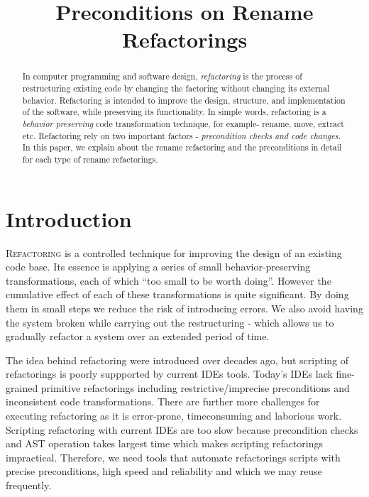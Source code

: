 \documentclass[10pt,conference]{IEEEtran}
\begin{document}
\title{Preconditions on Rename Refactorings}

\author{
\and
{}
\and
{}
}

\maketitle

\begin{abstract}
In computer programming and software design, \emph{refactoring} is the process of restructuring existing code by changing the factoring without changing its external behavior. Refactoring is intended to improve the design, structure, and implementation of the software, while preserving its functionality. In simple words, refactoring is a \emph{behavior preserving} code transformation technique, for example- rename, move, extract etc. Refactoring rely on two important factors - \emph{precondition checks and code changes}. In this paper, we explain about the rename refactoring and the preconditions in detail for each type of rename refactorings.
\end{abstract}

\section{\textbf{Introduction}}
\lettrine{R}{efactoring} is a controlled technique for improving the design of an existing code base. Its essence is applying a series of small behavior-preserving transformations, each of which ``too small to be worth doing''. However the cumulative effect of each of these transformations is quite significant. By doing them in small steps we reduce the risk of introducing errors. We also avoid having the system broken while carrying out the restructuring - which allows us to gradually refactor a system over an extended period of time.~\cite{Fowler}

The idea behind refactoring were introduced over decades ago, but scripting of refactorings is poorly suppported by current IDEs tools. Today’s IDEs lack fine-grained primitive refactorings including restrictive/imprecise preconditions and inconsistent code transformations. There are further more challenges for executing refactoring as it is error-prone, timeconsuming and laborious work. Scripting refactoring with current IDEs are too slow because precondition checks and AST operation takes largest time which makes scripting refactorings impractical. Therefore, we need tools that automate refactorings scripts with precise preconditions, high speed and reliability and which we may reuse frequently. 
\end{document}
